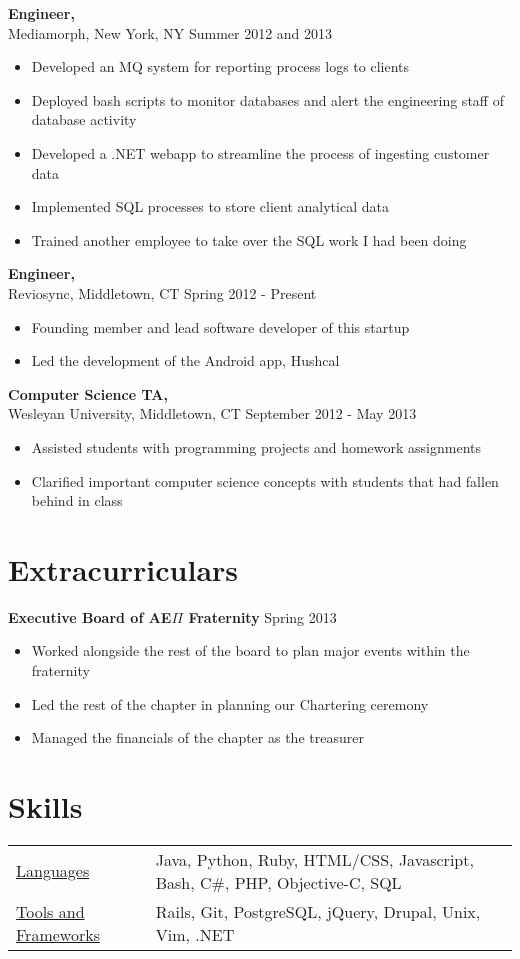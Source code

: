 \documentclass[margin, 9pt]{res}
\begin{document}
\begin{resume}
{\bf Engineer, } \\ Mediamorph, New York, NY \hfill Summer 2012 and 2013
\begin{itemize} \itemsep -2pt
  \item Developed an MQ system for reporting process logs to clients
  \item Deployed bash scripts to monitor databases and alert the engineering staff of database activity
  \item Developed a .NET webapp to streamline the process of ingesting customer data
  \item Implemented SQL processes to store client analytical data
  \item Trained another employee to take over the SQL work I had been doing
\end{itemize}

{\bf Engineer, } \\ Reviosync, Middletown, CT \hfill Spring 2012 - Present
\begin{itemize} \itemsep -2pt
  \item Founding member and lead software developer of this startup
  \item Led the development of the Android app, Hushcal
\end{itemize}

{\bf Computer Science TA, } \\ Wesleyan University, Middletown, CT \hfill September 2012 - May 2013
\begin{itemize} \itemsep -2pt
  \item Assisted students with programming projects and homework assignments
  \item Clarified important computer science concepts with students that had fallen behind in class
\end{itemize}

\section{Extracurriculars}
{\bf Executive Board of AE$\Pi$ Fraternity} \hfill Spring 2013
\begin{itemize} \itemsep -2pt
  \item Worked alongside the rest of the board to plan major events within the fraternity
  \item Led the rest of the chapter in planning our Chartering ceremony
  \item Managed the financials of the chapter as the treasurer
\end{itemize}

\section{Skills}
\begin{tabular}{l p{3in}}
  \underline{Languages} & Java, Python, Ruby, HTML/CSS, Javascript, Bash, C\#, PHP, Objective-C, SQL \\
  \underline{Tools and Frameworks} & Rails, Git, PostgreSQL, jQuery, Drupal, Unix, Vim, .NET
\end{tabular}

\end{resume}
\end{document}
